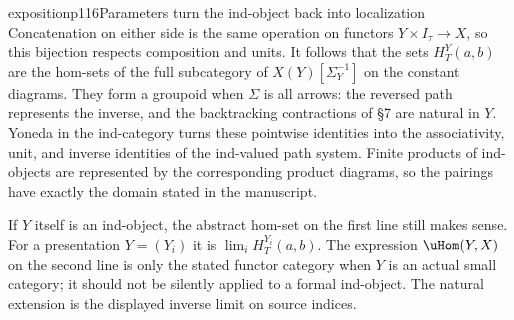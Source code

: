 \begin{dcomment}{exposition}{p116}{Parameters turn the ind-object back into localization}
Concatenation on either side is the same operation on functors $Y\times I_\tau\to X$, so this bijection respects composition and units. It follows that the sets $H_T^Y(a,b)$ are the hom-sets of the full subcategory of $X(Y)[\Sigma_Y^{-1}]$ on the constant diagrams. They form a groupoid when $\Sigma$ is all arrows: the reversed path represents the inverse, and the backtracking contractions of \S7 are natural in $Y$. Yoneda in the ind-category turns these pointwise identities into the associativity, unit, and inverse identities of the ind-valued path system. Finite products of ind-objects are represented by the corresponding product diagrams, so the pairings have exactly the domain stated in the manuscript.

If $Y$ itself is an ind-object, the abstract hom-set on the first line still makes sense. For a presentation $Y=(Y_i)$ it is $\lim_i H_T^{Y_i}(a,b)$. The expression $\uHom(Y,X)$ on the second line is only the stated functor category when $Y$ is an actual small category; it should not be silently applied to a formal ind-object. The natural extension is the displayed inverse limit on source indices.
\end{dcomment}

